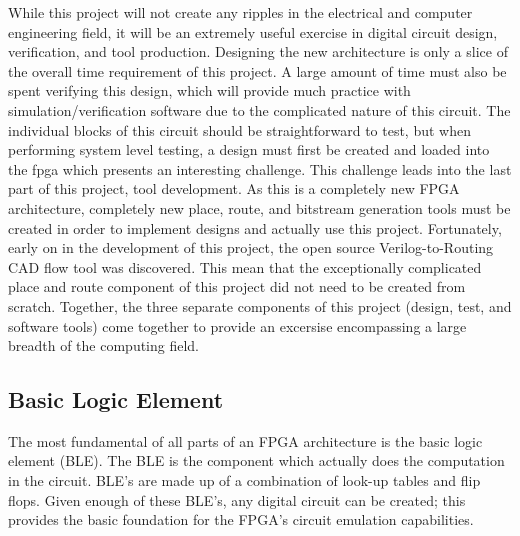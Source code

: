 \documentclass[12pt]{article}
\begin{document}
While this project will not create any ripples in the electrical and computer engineering 
field, it will be an extremely useful exercise in digital circuit design, verification,
and tool production. Designing the new architecture is only a slice of the overall 
time requirement of this project. A large amount of time must also be spent verifying 
this design, which will provide much practice with simulation/verification software 
due to the complicated nature of this circuit. The individual blocks of this circuit 
should be straightforward to test, but when performing system level testing, a design 
must first be created and loaded into the fpga which presents an interesting challenge.
This challenge leads into the last part of this project, tool development. As this 
is a completely new FPGA architecture, completely new place, route, and bitstream generation tools must 
be created in order to implement designs and actually use this project. Fortunately,
early on in the development of this project, the open source Verilog-to-Routing \cite{vtr} CAD flow
tool was discovered. This mean that the exceptionally complicated place and route component
of this project did not need to be created from scratch. Together, the three separate
components of this project (design, test, and software tools) come together to provide an
excersise encompassing a large breadth of the computing field.

\subsection{Basic Logic Element}

The most fundamental of all parts of an FPGA architecture is the basic logic element 
(BLE). The BLE is the component which actually does the computation in the circuit.
BLE’s are made up of a combination of look-up tables and flip flops. Given enough 
of these BLE’s, any digital circuit can be created; this provides the 
basic foundation for the FPGA’s circuit emulation capabilities.
\end{document}
